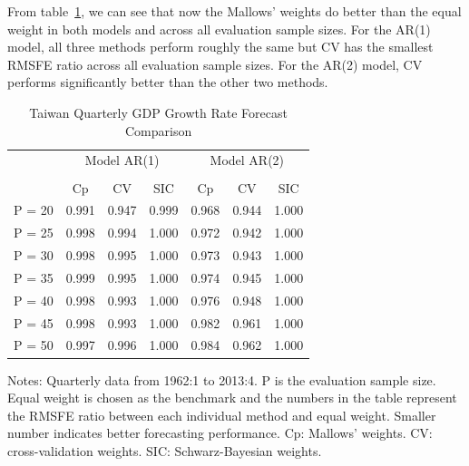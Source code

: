 From table~\ref{ntb:5}, we can see that now the Mallows' weights do better than the equal weight in both models and across all evaluation sample sizes. For the AR(1) model, all three methods perform roughly the same but CV has the smallest RMSFE ratio across all evaluation sample sizes. For the AR(2) model, CV performs significantly better than the other two methods.
\begin{table}
    \caption{Taiwan Quarterly GDP Growth Rate Forecast Comparison} \label{ntb:5}
    \centering
    \begin{adjustbox}{keepaspectratio}
    \begin{threeparttable}
    \begin{tabular}{lcccccc}
    \toprule
     & \multicolumn{3}{c}{Model AR(1)} & \multicolumn{3}{c}{Model AR(2)}\\%
    \cmidrule(r){2-4}
    \cmidrule(r){5-7}\\
           & Cp    & CV    & SIC  & Cp    & CV    & SIC  \\
    P = 20 & 0.991 & 0.947 & 0.999& 0.968 & 0.944 &1.000\\
    P = 25 & 0.998 & 0.994 & 1.000& 0.972 & 0.942 &1.000\\
    P = 30 & 0.998 & 0.995 & 1.000& 0.973 & 0.943 &1.000\\
    P = 35 & 0.999 & 0.995 & 1.000& 0.974 & 0.945 &1.000\\
    P = 40 & 0.998 & 0.993 & 1.000& 0.976 & 0.948 &1.000\\
    P = 45 & 0.998 & 0.993 & 1.000& 0.982 & 0.961 &1.000\\
    P = 50 & 0.997 & 0.996 & 1.000& 0.984 & 0.962 &1.000\\
    \bottomrule
    \end{tabular}
    \begin{tablenotes} \footnotesize
    Notes: Quarterly data from 1962:1 to 2013:4. $\mathrm{P}$ is the evaluation sample size. Equal weight is chosen as the benchmark and the numbers in the table represent the RMSFE ratio between each individual method and equal weight. Smaller number indicates better forecasting performance. Cp: Mallows' weights. CV: cross-validation weights. SIC: Schwarz-Bayesian weights.
    \end{tablenotes}
    \end{threeparttable}
    \end{adjustbox}
\end{table} 